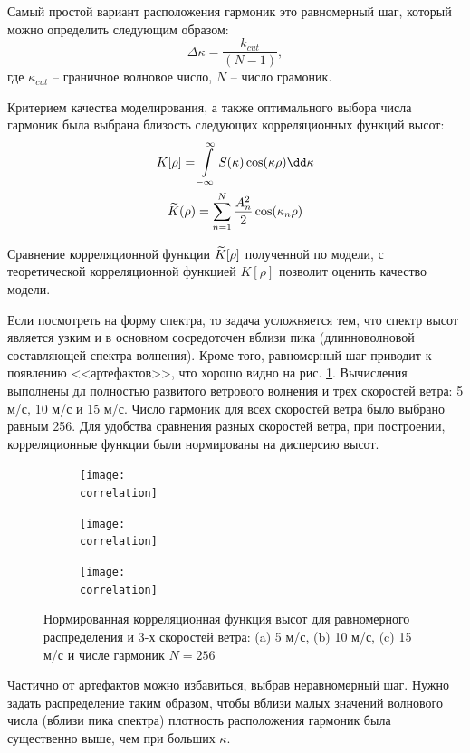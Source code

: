 Самый простой вариант расположения гармоник это равномерный шаг, который можно определить следующим образом:
\begin{equation}
    \Delta \kappa = \frac{k_{cut}}{(N-1)}, 
\end{equation}
где $\kappa_{cut}$ -- граничное волновое число, $N$ -- число грамоник.



Критерием качества моделирования, а также оптимального выбора числа гармоник
была выбрана близость следующих корреляционных функций высот:
\begin{equation}
    \begin{gathered}
        \label{eq:KK}
        K[\rho] = \int\limits_{-\infty}^{\infty} S(\kappa) \cos(\kappa\rho) \dd \kappa\\
        \tK(\rho) = \sum\limits_{n=1}^{N} \frac{A_n^2}{2} \cos(\kappa_n \rho)
    \end{gathered}
\end{equation}




Сравнение корреляционной функции $\widetilde K[\rho]$ полученной по модели, с
теоретической корреляционной функцией $K[\rho]$   позволит оценить качество
модели.  

Если посмотреть на форму спектра, то задача усложняется тем,
что спектр высот является узким и в основном сосредоточен вблизи пика
(длинноволновой составляющей спектра волнения).  Кроме того, равномерный шаг
приводит к появлению <<артефактов>>, что хорошо видно на рис.
\ref{fig:corr_h_lin}.
Вычисления выполнены дл полностью развитого ветрового волнения и трех скоростей
ветра: 5 м/с, 10 м/с и 15 м/с. Число гармоник для всех скоростей ветра было
выбрано равным 256. Для удобства сравнения разных скоростей ветра, при
построении, корреляционные функции были нормированы на дисперсию высот.
\def\correlation{fig/water/correlation}
\begin{figure}[H]
    \centering
    \begin{subfigure}{0.49\linewidth}
        \centering
        \texttt{[image: \\correlation]}
    \end{subfigure}
    \hfill
    \begin{subfigure}{0.49\linewidth}
        \centering
        \texttt{[image: \\correlation]}
    \end{subfigure}
    \begin{subfigure}{0.49\linewidth}
        \centering
        \texttt{[image: \\correlation]}
    \end{subfigure}
    \caption{Нормированная корреляционная функция высот для равномерного распределения и 3-х
    скоростей ветра: (a) 5 м/с,  (b) 10 м/с, (c) 15 м/с и числе
гармоник $N=256$}
    \label{fig:corr_h_lin}
\end{figure}
Частично от артефактов можно избавиться, выбрав неравномерный шаг. Нужно задать
распределение таким образом, чтобы вблизи малых значений волнового числа
(вблизи пика спектра) плотность расположения гармоник была существенно выше,
чем при больших $\kappa$.

